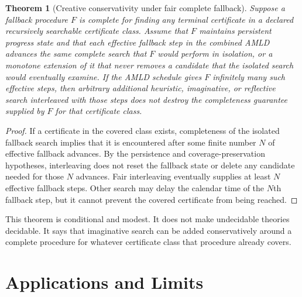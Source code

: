 \documentclass[11pt,openany]{book}
\newtheorem{theorem}{Theorem}[chapter]
\theoremstyle{definition}
\theoremstyle{remark}
\begin{document}
\begin{theorem}[Creative conservativity under fair complete fallback]\label{thm:fallback}
Suppose a fallback procedure $F$ is complete for finding any terminal certificate in a declared recursively searchable certificate class. Assume that $F$ maintains persistent progress state and that each effective fallback step in the combined AMLD advances the same complete search that $F$ would perform in isolation, or a monotone extension of it that never removes a candidate that the isolated search would eventually examine. If the AMLD schedule gives $F$ infinitely many such effective steps, then arbitrary additional heuristic, imaginative, or reflective search interleaved with those steps does not destroy the completeness guarantee supplied by $F$ for that certificate class.
\end{theorem}
\begin{proof}
If a certificate in the covered class exists, completeness of the isolated fallback search implies that it is encountered after some finite number $N$ of effective fallback advances. By the persistence and coverage-preservation hypotheses, interleaving does not reset the fallback state or delete any candidate needed for those $N$ advances. Fair interleaving eventually supplies at least $N$ effective fallback steps. Other search may delay the calendar time of the $N$th fallback step, but it cannot prevent the covered certificate from being reached.
\end{proof}

This theorem is conditional and modest. It does not make undecidable theories decidable. It says that imaginative search can be added conservatively around a complete procedure for whatever certificate class that procedure already covers.

\part{Applications and Limits}
\end{document}

